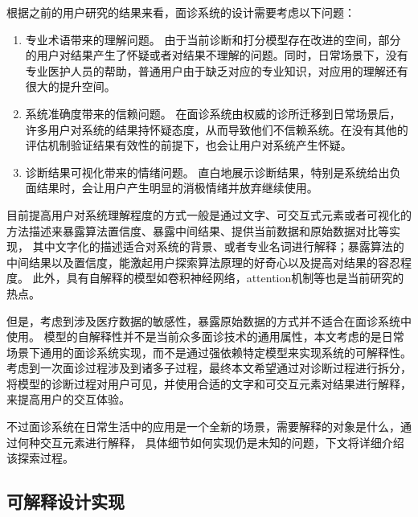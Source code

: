 根据之前的用户研究的结果来看，面诊系统的设计需要考虑以下问题：
\begin{enumerate}
    \item 专业术语带来的理解问题。
    由于当前诊断和打分模型存在改进的空间，部分的用户对结果产生了怀疑或者对结果不理解的问题。同时，日常场景下，没有专业医护人员的帮助，普通用户由于缺乏对应的专业知识，对应用的理解还有很大的提升空间。
    \item 系统准确度带来的信赖问题。
    在面诊系统由权威的诊所迁移到日常场景后，许多用户对系统的结果持怀疑态度，从而导致他们不信赖系统。在没有其他的评估机制验证结果有效性的前提下，也会让用户对系统产生怀疑。
    \item 诊断结果可视化带来的情绪问题。
    直白地展示诊断结果，特别是系统给出负面结果时，会让用户产生明显的消极情绪并放弃继续使用。
\end{enumerate}


目前提高用户对系统理解程度的方式一般是通过文字、可交互式元素或者可视化的方法描述来暴露算法置信度、暴露中间结果、提供当前数据和原始数据对比等实现\cite{wang2019designing, kocielnik2019will}，
其中文字化的描述适合对系统的背景、或者专业名词进行解释；暴露算法的中间结果以及置信度，能激起用户探索算法原理的好奇心以及提高对结果的容忍程度。
此外，具有自解释的模型如卷积神经网络，attention机制等也是当前研究的热点。

但是，考虑到涉及医疗数据的敏感性，暴露原始数据的方式并不适合在面诊系统中使用。
模型的自解释性并不是当前众多面诊技术的通用属性，本文考虑的是日常场景下通用的面诊系统实现，而不是通过强依赖特定模型来实现系统的可解释性。
考虑到一次面诊过程涉及到诸多子过程，最终本文希望通过对诊断过程进行拆分，将模型的诊断过程对用户可见，并使用合适的文字和可交互元素对结果进行解释，来提高用户的交互体验。


不过面诊系统在日常生活中的应用是一个全新的场景，需要解释的对象是什么，通过何种交互元素进行解释，
具体细节如何实现仍是未知的问题，下文将详细介绍该探索过程。


\subsection{可解释设计实现}

